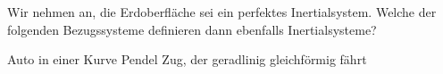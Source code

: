 Wir nehmen an, die Erdoberfläche sei ein perfektes Inertialsystem. Welche der folgenden Bezugssysteme definieren dann ebenfalls Inertialsysteme?

\begin{abcliste}
\abc Auto in einer Kurve
\abc Pendel
\abc Zug, der geradlinig gleichförmig fährt
\end{abcliste}
